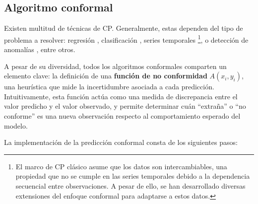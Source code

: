 



\subsection{Algoritmo conformal}

Existen multitud de técnicas de \acrshort{CP}. Generalmente, estas dependen del tipo de problema a resolver: regresión \cite{papadopoulos2002, romano2019, bethell2024}, clasificación \cite{sadinle2019, romano2020, angelopoulos2020}, series temporales \cite{xu2021, zaffran2022, stankeviciute2021}%
\footnote{
    El marco de \acrshort{CP} clásico asume que los datos son intercambiables, una propiedad que no se cumple en las series temporales debido a la dependencia secuencial entre observaciones. A pesar de ello, se han desarrollado diversas extensiones del enfoque conformal para adaptarse a estos datos.
},
o detección de anomalías \cite{laxhammar2015}, entre otros. 

A pesar de su diversidad, todos los algoritmos conformales comparten un elemento clave: la definición de una 
\textbf{función de no conformidad} $A(x_i,y_i)$, una heurística que mide la incertidumbre asociada a cada predicción. Intuitivamente, esta función actúa como una medida de discrepancia entre el valor predicho y el valor observado, y permite determinar cuán ``extraña'' o ``no conforme'' es una nueva observación respecto al comportamiento esperado del modelo.

La implementación de la predicción conformal consta de los siguientes pasos:

